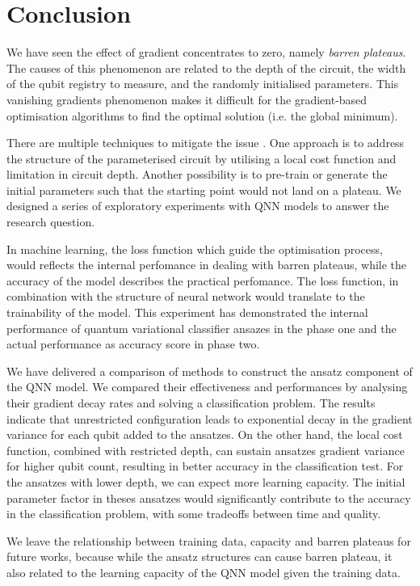 \section{Conclusion}
We have seen the effect of gradient concentrates to zero, namely \emph{barren plateaus}.
The causes of this phenomenon are related to the depth of the circuit, the width of the qubit registry to measure, and the randomly initialised parameters.
This vanishing gradients phenomenon makes it difficult for the gradient-based optimisation algorithms to find the optimal solution (i.e. the global minimum).

There are multiple techniques to mitigate the issue \cite{cerezoCostFunctionDependent2021, skolikLayerwiseLearningQuantum2021, grantInitializationStrategyAddressing2019}.
One approach is to address the structure of the parameterised circuit by utilising a local cost function and limitation in circuit depth.
Another possibility is to pre-train or generate the initial parameters such that the starting point would not land on a plateau.
We designed a series of exploratory experiments with QNN models to answer the research question.

In machine learning, the loss function which guide the optimisation process, would reflects the internal perfomance in dealing with barren plateaus, while the accuracy of the model describes the practical perfomance.
The loss function, in combination with the structure of neural network would translate to the trainability of the model.
This experiment has demonstrated the internal performance of quantum variational classifier ansazes in the phase one and the actual performance as accuracy score in phase two.

We have delivered a comparison of methods to construct the ansatz component of the QNN model.
We compared their effectiveness and performances by analysing their gradient decay rates and solving a classification problem.
The results indicate that unrestricted configuration leads to exponential decay in the gradient variance for each qubit added to the ansatzes.
On the other hand, the local cost function, combined with restricted depth, can sustain ansatzes gradient variance for higher qubit count, resulting in better accuracy in the classification test.
For the ansatzes with lower depth, we can expect more learning capacity.
The initial parameter factor in theses ansatzes would significantly contribute to the accuracy in the classification problem, with some tradeoffs between time and quality.

We leave the relationship between training data, capacity and barren plateaus for future works, because while the ansatz structures can cause barren plateau, it also related to the learning capacity of the QNN model given the training data.
